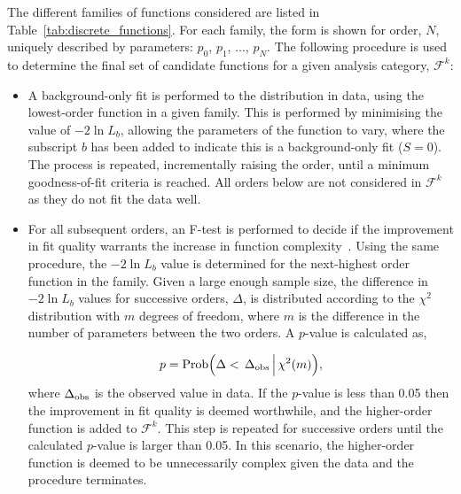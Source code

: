 The different families of functions considered are listed in Table~\ref{tab:discrete_functions}. For each family, the form is shown for order, $N$, uniquely described by parameters: $p_0$, $p_1$, ..., $p_N$. The following procedure is used to determine the final set of candidate functions for a given analysis category, $\mathcal{F}^k$:
\begin{itemize}
    \item A background-only fit is performed to the \mgg distribution in data, using the lowest-order function in a given family. This is performed by minimising the value of $-2\ln{L}_b$, allowing the parameters of the function to vary, where the subscript $b$ has been added to indicate this is a background-only fit ($S=0$). 
    The process is repeated, incrementally raising the order, until a minimum goodness-of-fit criteria is reached. All orders below are not considered in $\mathcal{F}^k$ as they do not fit the data well.
    
    \item For all subsequent orders, an F-test is performed to decide if the improvement in fit quality warrants the increase in function complexity~\cite{10.2307/2340521}. Using the same procedure, the $-2\ln{L}_b$ value is determined for the next-highest order function in the family. Given a large enough sample size, the difference in $-2\ln{L}_b$ values for successive orders, $\Delta$, is distributed according to the $\chi^2$ distribution with $m$ degrees of freedom, where $m$ is the difference in the number of parameters between the two orders. A $p$-value is calculated as,
    
    \begin{equation}
        p = {\rm{Prob}}\Big(\Delta<\,\Delta_{\rm{obs}}\,\Big|\,\chi^2(m)\Big),
    \end{equation}
    \noindent
    where $\Delta_{\rm{obs}}$ is the observed value in data. If the $p$-value is less than 0.05 then the improvement in fit quality is deemed worthwhile, and the higher-order function is added to $\mathcal{F}^k$. This step is repeated for successive orders until the calculated $p$-value is larger than 0.05. In this scenario, the higher-order function is deemed to be unnecessarily complex given the data and the procedure terminates.


\end{itemize}

